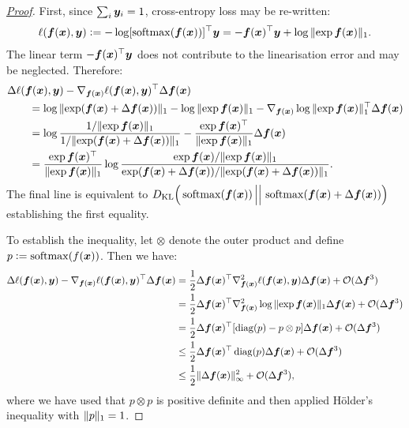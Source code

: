 \xentbreg*
\begin{proof}[\mbox{\hyperref[lem:xent-bregman]{Proof}}]\label{proof:xentbreg}
First, since $\sum_i {\bm{y}}_i =1$, cross-entropy loss may be re-written:
\begin{align*}
    \ell({\bm{f}}({\bm{x}}), {\bm{y}}) \vcentcolon= - \log [\operatorname{softmax}({\bm{f}}({\bm{x}}))]^\top {\bm{y}} = - {\bm{f}}({\bm{x}})^\top {\bm{y}} +  \log \Vert {\exp {\bm{f}}({\bm{x}})} \Vert_1.
\end{align*}
The linear term $- {\bm{f}}({\bm{x}})^\top {\bm{y}}$ does not contribute to the linearisation error and may be neglected. Therefore:
\begin{align*}
    &\Delta \ell({\bm{f}}({\bm{x}}), {\bm{y}}) -\nabla_{{\bm{f}}({\bm{x}})}\ell({\bm{f}}({\bm{x}}),{\bm{y}})^\top \Delta {\bm{f}}({\bm{x}}) \\
    &\quad\quad= \log \Vert {\exp ({\bm{f}}({\bm{x}})+\Delta {\bm{f}}({\bm{x}}))} \Vert_1 - \log \Vert {\exp {\bm{f}}({\bm{x}})} \Vert_1 - \nabla_{{\bm{f}}({\bm{x}})}\log \Vert {\exp {\bm{f}}({\bm{x}})} \Vert_1^\top \Delta {\bm{f}}({\bm{x}}) \\
    &\quad\quad= \log \frac{1/\Vert {\exp {\bm{f}}({\bm{x}})} \Vert_1}{1/\Vert {\exp ({\bm{f}}({\bm{x}})+\Delta {\bm{f}}({\bm{x}}))} \Vert_1} - \frac{\exp{\bm{f}}({\bm{x}})^\top}{\Vert {\exp {\bm{f}}({\bm{x}})} \Vert_1} \Delta {\bm{f}}({\bm{x}})\\
    &\quad\quad=\frac{\exp{\bm{f}}({\bm{x}})^\top}{\Vert {\exp {\bm{f}}({\bm{x}})} \Vert_1} \log \frac{\exp {\bm{f}}({\bm{x}})/\Vert {\exp {\bm{f}}({\bm{x}})} \Vert_1}{\exp ({\bm{f}}({\bm{x}})+\Delta {\bm{f}}({\bm{x}}))/\Vert {\exp ({\bm{f}}({\bm{x}})+\Delta {\bm{f}}({\bm{x}}))} \Vert_1}.
\end{align*}
The final line is equivalent to $D_\mathrm{KL} \Big(\operatorname{softmax}({\bm{f}}({\bm{x}}))\,\Big|\Big|\, \operatorname{softmax}({\bm{f}}({\bm{x}})+\Delta {\bm{f}}({\bm{x}}))\Big)$ establishing the first equality.

To establish the inequality, let $\otimes$ denote the outer product and define $p \vcentcolon=\operatorname{softmax}(f({\bm{x}}))$. Then we have:
\begin{align*}
    \Delta \ell({\bm{f}}({\bm{x}}), {\bm{y}}) -\nabla_{{\bm{f}}({\bm{x}})}\ell({\bm{f}}({\bm{x}}),{\bm{y}})^\top \Delta {\bm{f}}({\bm{x}}) &= \frac{1}{2}\Delta {\bm{f}}({\bm{x}})^\top \nabla^2_{{\bm{f}}({\bm{x}})}\ell({\bm{f}}({\bm{x}}), {\bm{y}}) \Delta {\bm{f}}({\bm{x}}) + \mathcal{O}(\Delta {\bm{f}}^3) \\
    &= \frac{1}{2}\Delta {\bm{f}}({\bm{x}})^\top \nabla^2_{{\bm{f}}({\bm{x}})}\log \Vert {\exp {\bm{f}}({\bm{x}})} \Vert_1 \Delta {\bm{f}}({\bm{x}}) + \mathcal{O}(\Delta {\bm{f}}^3)\\
    &= \frac{1}{2}\Delta {\bm{f}}({\bm{x}})^\top [\operatorname{diag} (p) - p \otimes p] \Delta {\bm{f}}({\bm{x}}) + \mathcal{O}(\Delta {\bm{f}}^3)\\
    &\leq \frac{1}{2}\Delta {\bm{f}}({\bm{x}})^\top \operatorname{diag} (p) \Delta {\bm{f}}({\bm{x}}) + \mathcal{O}(\Delta {\bm{f}}^3)\\
    &\leq \frac{1}{2}\Vert {\Delta {\bm{f}}({\bm{x}})} \Vert_\infty^2 + \mathcal{O}(\Delta {\bm{f}}^3),
\end{align*}
where we have used that $p\otimes p$ is positive definite and then applied H\"older's inequality with $\Vert {p} \Vert_1 = 1$.
\end{proof}

